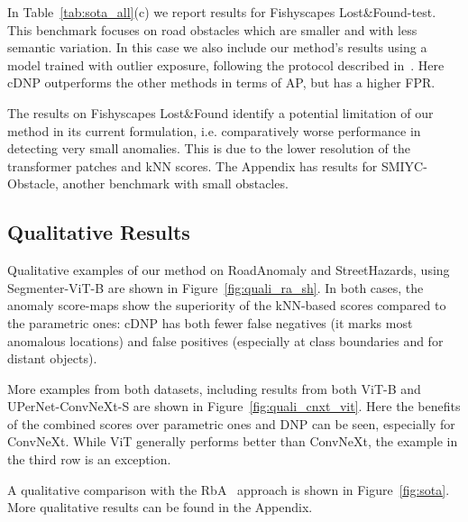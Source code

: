 \documentclass[10pt,twocolumn,letterpaper]{article}
\begin{document}
In Table~\ref{tab:sota_all}(c) we report results for Fishyscapes Lost\&Found-test. This benchmark focuses on road obstacles which are smaller and with less semantic variation. In this case we also include our method's results using a model trained with outlier exposure, following the protocol described in~\cite{Chan2021EntropyMA}. Here cDNP outperforms the other methods in terms of AP, but has a higher FPR.

The results on Fishyscapes Lost\&Found identify a potential limitation of our method in its current formulation, i.e. comparatively worse performance in detecting very small anomalies. This is due to the lower resolution of the transformer patches and kNN scores.
The Appendix has results for SMIYC-Obstacle, another benchmark with small obstacles.


\subsection{Qualitative Results}

Qualitative examples of our method on RoadAnomaly and StreetHazards, using Segmenter-ViT-B are shown in Figure~\ref{fig:quali_ra_sh}.
In both cases, the anomaly score-maps show the superiority of the kNN-based scores compared to the parametric ones: cDNP has both fewer false negatives (it marks most anomalous locations) and false positives (especially at class boundaries and for distant objects).

More examples from both datasets, including results from both ViT-B and UPerNet-ConvNeXt-S are shown in Figure~\ref{fig:quali_cnxt_vit}. Here the benefits of the combined scores over parametric ones and DNP can be seen, especially for ConvNeXt.
While ViT generally performs better than ConvNeXt, the example in the third row is an exception.

A qualitative comparison with the RbA~\cite{RbA} approach is shown in Figure~\ref{fig:sota}. More qualitative results can be found in the Appendix.
\end{document}
